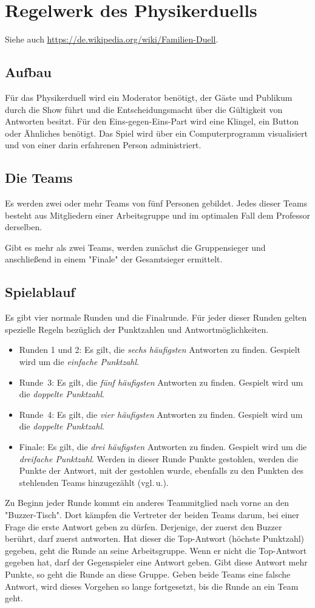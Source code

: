 \documentclass[a4paper, 12pt, headlines=2.1, headsepline, ngerman]{scrartcl}
\begin{document}
\section*{Regelwerk des Physikerduells}
Siehe auch \url{https://de.wikipedia.org/wiki/Familien-Duell}.

\subsection*{Aufbau}
Für das Physikerduell wird ein Moderator benötigt, der Gäste und Publikum durch die Show führt und die Entscheidungsmacht über die Gültigkeit von Antworten besitzt.
Für den Eins-gegen-Eins-Part wird eine Klingel, ein Button oder Ähnliches benötigt.
Das Spiel wird über ein Computerprogramm visualisiert und von einer darin erfahrenen Person administriert.

\subsection*{Die Teams}
Es werden zwei oder mehr Teams von fünf Personen gebildet.
Jedes dieser Teams besteht aus Mitgliedern einer Arbeitsgruppe und im optimalen Fall dem Professor derselben.

Gibt es mehr als zwei Teams, werden zunächst die Gruppensieger und anschließend in einem "Finale" der Gesamtsieger ermittelt.

\subsection*{Spielablauf}
Es gibt vier normale Runden und die Finalrunde.
Für jeder dieser Runden gelten spezielle Regeln bezüglich der Punktzahlen und Antwortmöglichkeiten.
\begin{itemize}
	\item Runden 1 und 2:
	Es gilt, die \emph{sechs häufigsten} Antworten zu finden.
	Gespielt wird um die \emph{einfache Punktzahl}.
	\item Runde~3: Es gilt, die \emph{fünf häufigsten} Antworten zu finden.
	Gespielt wird um die \emph{doppelte Punktzahl}.
	\item Runde~4: Es gilt, die \emph{vier häufigsten} Antworten zu finden.
	Gespielt wird um die \emph{doppelte Punktzahl}.
	\item Finale: Es gilt, die \emph{drei häufigsten} Antworten zu finden.
	Gespielt wird um die \emph{dreifache Punktzahl}.
	Werden in dieser Runde Punkte gestohlen, werden die Punkte der Antwort, mit der gestohlen wurde, ebenfalls zu den Punkten des stehlenden Teams hinzugezählt (vgl.\,u.).
\end{itemize}
Zu Beginn jeder Runde kommt ein anderes Teammitglied nach vorne an den "Buzzer-Tisch".
Dort kämpfen die Vertreter der beiden Teams darum, bei einer Frage die erste Antwort geben zu dürfen.
Derjenige, der zuerst den Buzzer berührt, darf zuerst antworten.
Hat dieser die Top-Antwort (höchste Punktzahl) gegeben, geht die Runde an seine Arbeitsgruppe.
Wenn er nicht die Top-Antwort gegeben hat, darf der Gegenspieler eine Antwort geben.
Gibt diese Antwort mehr Punkte, so geht die Runde an diese Gruppe.
Geben beide Teams eine falsche Antwort, wird dieses Vorgehen so lange fortgesetzt, bis die Runde an ein Team geht.
\end{document}
